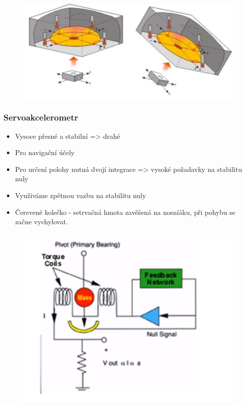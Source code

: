 \begin{figure}[h]
    \centering
    \includegraphics[scale = 0.50]{img/teplovib.png}
\end{figure}

\subsubsection*{Servoakcelerometr}
\begin{itemize}
    \item Vysoce přesné a stabilní => drahé
    \item Pro navigační účely
    \item Pro určení polohy nutná dvojí integrace => vysoké požadavky na stabilitu nuly
    \item Využíváme zpětnou vazbu na stabilitu nuly
    \item Čerevené kolečko - setrvačná hmota zavěšená na nosníáku, při pohybu se začne vychylovat.
\end{itemize}

\begin{figure}[h]
    \centering
    \includegraphics[scale = 0.50]{img/servoakVIB.png}
\end{figure}

